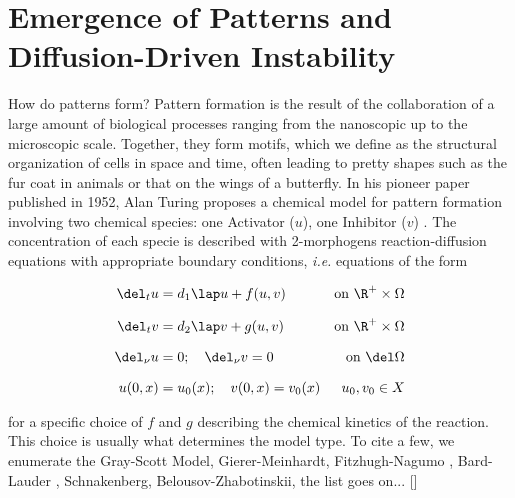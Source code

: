\section{Emergence of Patterns and Diffusion-Driven Instability}
How do patterns form? Pattern formation is the result of the collaboration of a large amount of biological processes ranging from the nanoscopic up to the microscopic scale. Together, they form motifs, which we define as the structural organization of cells in space and time, often leading to pretty shapes such as the fur coat in animals or that on the wings of a butterfly. In his pioneer paper  published in 1952, Alan Turing \cite{1952} proposes a chemical model for pattern formation involving two chemical species: one Activator ($u$), one Inhibitor ($v$) . The concentration of each specie is described with 2-morphogens reaction-diffusion equations with appropriate boundary conditions, \textit{i.e.} equations of the form 


\begin{align}
	\del_t u &= d_1 \lap u + f(u, v) &\text{on} \ \R^{+} \times \Omega \notag \\[0.7em]
	\del_t v &= d_2 \lap v + g(u, v) & \text{on} \ \R^{+} \times \Omega \\[0.7em]
	\del_\nu u & = 0; \quad \del_\nu v = 0 & \text{on} \ \del\Omega \notag \\[0.7em]
	u(0, x) &= u_0(x) ; \quad v(0, x) = v_0(x) & u_0, v_0 \in X
\end{align}
\label{eq:TuringModel}


for a specific choice of $f$ and $g$ describing the chemical kinetics of the reaction. This choice is usually what determines the model type. To cite a few, we enumerate the Gray-Scott Model,  Gierer-Meinhardt, Fitzhugh-Nagumo , Bard-Lauder , Schnakenberg, Belousov-Zhabotinskii, the list goes on... []
